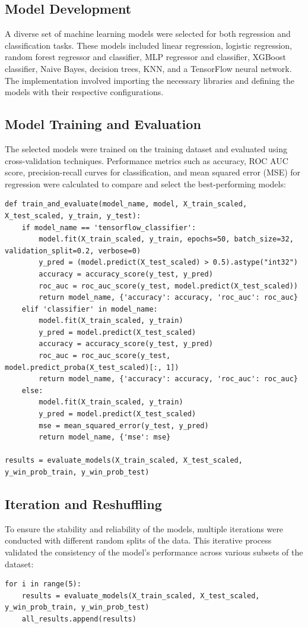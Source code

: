 \documentclass{article}
\begin{document}
\subsection*{Model Development}
A diverse set of machine learning models were selected for both regression and classification tasks. These models included linear regression, logistic regression, random forest regressor and classifier, MLP regressor and classifier, XGBoost classifier, Naive Bayes, decision trees, KNN, and a TensorFlow neural network. The implementation involved importing the necessary libraries and defining the models with their respective configurations.

\subsection*{Model Training and Evaluation}
The selected models were trained on the training dataset and evaluated using cross-validation techniques. Performance metrics such as accuracy, ROC AUC score, precision-recall curves for classification, and mean squared error (MSE) for regression were calculated to compare and select the best-performing models:
\begin{verbatim}
def train_and_evaluate(model_name, model, X_train_scaled, X_test_scaled, y_train, y_test):
    if model_name == 'tensorflow_classifier':
        model.fit(X_train_scaled, y_train, epochs=50, batch_size=32, validation_split=0.2, verbose=0)
        y_pred = (model.predict(X_test_scaled) > 0.5).astype("int32")
        accuracy = accuracy_score(y_test, y_pred)
        roc_auc = roc_auc_score(y_test, model.predict(X_test_scaled))
        return model_name, {'accuracy': accuracy, 'roc_auc': roc_auc}
    elif 'classifier' in model_name:
        model.fit(X_train_scaled, y_train)
        y_pred = model.predict(X_test_scaled)
        accuracy = accuracy_score(y_test, y_pred)
        roc_auc = roc_auc_score(y_test, model.predict_proba(X_test_scaled)[:, 1])
        return model_name, {'accuracy': accuracy, 'roc_auc': roc_auc}
    else:
        model.fit(X_train_scaled, y_train)
        y_pred = model.predict(X_test_scaled)
        mse = mean_squared_error(y_test, y_pred)
        return model_name, {'mse': mse}

results = evaluate_models(X_train_scaled, X_test_scaled, y_win_prob_train, y_win_prob_test)
\end{verbatim}

\subsection*{Iteration and Reshuffling}
To ensure the stability and reliability of the models, multiple iterations were conducted with different random splits of the data. This iterative process validated the consistency of the model's performance across various subsets of the dataset:
\begin{verbatim}
for i in range(5):
    results = evaluate_models(X_train_scaled, X_test_scaled, y_win_prob_train, y_win_prob_test)
    all_results.append(results)
\end{verbatim}
\end{document}
